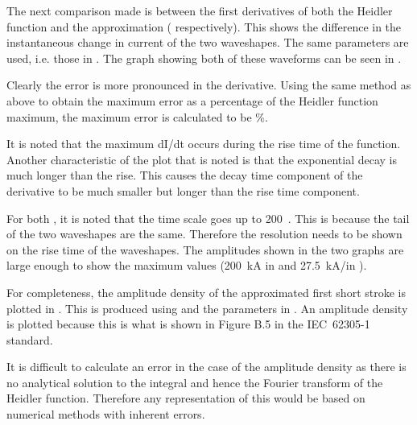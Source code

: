 The next comparison made is between the first derivatives of both the Heidler function and the approximation ( respectively). This shows the difference in the instantaneous change in current of the two waveshapes. The same parameters are used, i.e. those in . The graph showing both of these waveforms can be seen in .

Clearly the error is more pronounced in the derivative. Using the same method as above to obtain the maximum error as a percentage of the Heidler function maximum, the maximum error is calculated to be \unskip \%.

It is noted that the maximum dI/dt occurs during the rise time of the function. Another characteristic of the plot that is noted is that the exponential decay is much longer than the rise. This causes the decay time component of the derivative to be much smaller but longer than the rise time component.

For both , it is noted that the time scale goes up to 200~\usec. This is because the tail of the two waveshapes are the same. Therefore the resolution needs to be shown on the rise time of the waveshapes. The amplitudes shown in the two graphs are large enough to show the maximum values (200~kA in  and 27.5~kA/\usec in ).

For completeness, the amplitude density of the approximated first short stroke is plotted in . This is produced using  and the parameters in . An amplitude density is plotted because this is what is shown in Figure B.5 in the IEC~62305-1 standard.

It is difficult to calculate an error in the case of the amplitude density as there is no analytical solution to the integral and hence the Fourier transform of the Heidler function. Therefore any representation of this would be based on numerical methods with inherent errors.


